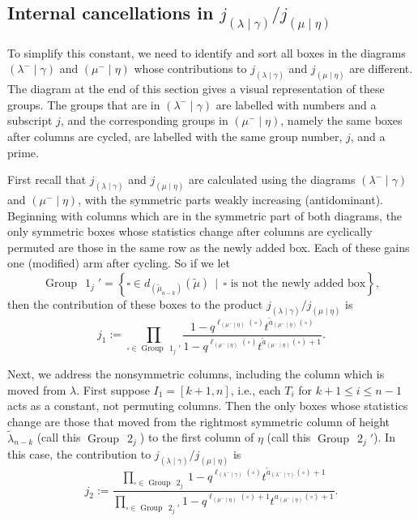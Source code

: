 \documentclass[ALCO]{cedram}
\newcommand{\nudom}{{( \lambda \mid \gamma )}}
\newcommand{\lambdagamma}{{\nudom}}
\newcommand{\mueta}{{(\mu \mid \eta)}}
\newcommand{\mutilde}{{\widetilde{\mu}}}
\newcommand{\lambdatilde}{{\widetilde{\lambda}}}
\newcommand{\lambdamingamma}{(\lambda^- \mid \gamma)}
\newcommand{\mumineta}{(\mu^- \mid \eta)}
\newcommand{\leg}[1]{{\ell_{#1}(\square)}}
\newcommand{\armone}[1]{{\widetilde{a}_{#1}(\square)}}
\newcommand{\armtwo}[1]{{a_{#1}(\square)}}
\newcommand{\group}[1]{\operatorname{Group}\,\operatorname{#1}}
\newcommand{\jone}{j_1}
\newcommand{\jtwo}{j_2}
\begin{document}
\subsection{\texorpdfstring{Internal cancellations in $j_\lambdagamma/j_\mueta$}{Internal cancellations in jlambdagamma/jmueta}} To simplify this constant, we need to identify and sort all boxes in the diagrams $\lambdamingamma$ and $\mumineta$ whose contributions to $j_\lambdagamma$ and $j_\mueta$ are different. The diagram at the end of this section gives a visual representation of these groups. The groups that are in $\lambdamingamma$ are labelled with numbers and a subscript $j$, and the corresponding groups in $\mumineta$, namely the same boxes after columns are cycled, are labelled with the same group number, $j$, and a prime.

First recall that $j_\lambdagamma$ and $j_\mueta$ are calculated using the diagrams $\lambdamingamma$ and $\mumineta$, with the symmetric parts weakly increasing (antidominant). 
Beginning with columns which are in the symmetric part of both diagrams, the only symmetric boxes whose statistics change after columns are cyclically permuted are those in the same row as the newly added box. Each of these gains one (modified) arm after cycling. So if we let
\[ \group{1}_j'=\left\{\square \in d_{(\mutilde_{n-k})}(\mutilde) \, \mid \, \square \text{ is not the newly added box}\right\},\]
then the contribution of these boxes to the product $j_\lambdagamma/j_\mueta$ is
\begin{equation}\label{groupAproduct} \jone := \prod_{\square \in \group{1}_j'} \frac{1-q^{\leg{\mumineta}}t^{\armone{\mumineta}}}{1-q^{\leg{\mumineta}}t^{\armone{\mumineta}+1}}.\end{equation}


Next, we address the nonsymmetric columns, including the column which is moved from $\lambda$. First suppose $I_1=[k+1,n]$, i.e., each $T_i$ for $k+1\leq i \leq n-1$ acts as a constant, not permuting columns. Then the only boxes whose statistics change are those that moved from the rightmost symmetric column of height $\lambdatilde_{n-k}$ (call this $\group{2}_j$) to the first column of $\eta$ (call this $\group{2}_j'$).
In this case, the contribution to $j_\lambdagamma/j_\mueta$ is
\begin{equation}\jtwo := \frac{\prod\limits_{\square \in \group{2}_j}1-q^{\leg{\lambdamingamma}}t^{\armone{\lambdamingamma}+1} }{\prod\limits_{\square \in \group{2}_j'} 1-q^{\leg{\mumineta}+1}t^{\armtwo{\mumineta}+1}}.\end{equation}
\end{document}
